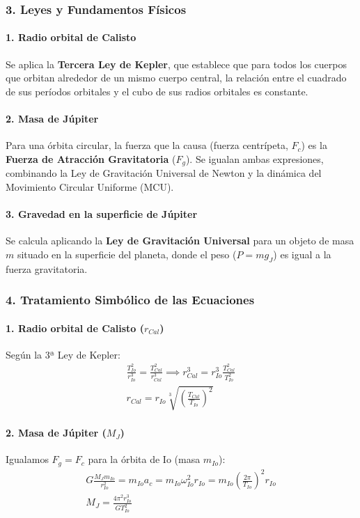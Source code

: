 \subsubsection*{3. Leyes y Fundamentos Físicos}
\paragraph*{1. Radio orbital de Calisto}
Se aplica la \textbf{Tercera Ley de Kepler}, que establece que para todos los cuerpos que orbitan alrededor de un mismo cuerpo central, la relación entre el cuadrado de sus períodos orbitales y el cubo de sus radios orbitales es constante.

\paragraph*{2. Masa de Júpiter}
Para una órbita circular, la fuerza que la causa (fuerza centrípeta, $F_c$) es la \textbf{Fuerza de Atracción Gravitatoria} ($F_g$). Se igualan ambas expresiones, combinando la Ley de Gravitación Universal de Newton y la dinámica del Movimiento Circular Uniforme (MCU).

\paragraph*{3. Gravedad en la superficie de Júpiter}
Se calcula aplicando la \textbf{Ley de Gravitación Universal} para un objeto de masa $m$ situado en la superficie del planeta, donde el peso ($P=mg_J$) es igual a la fuerza gravitatoria.

\subsubsection*{4. Tratamiento Simbólico de las Ecuaciones}
\paragraph*{1. Radio orbital de Calisto ($r_{Cal}$)}
Según la 3ª Ley de Kepler:
\begin{gather}
    \frac{T_{Io}^2}{r_{Io}^3} = \frac{T_{Cal}^2}{r_{Cal}^3} \implies r_{Cal}^3 = r_{Io}^3 \frac{T_{Cal}^2}{T_{Io}^2} \nonumber \\[8pt]
    r_{Cal} = r_{Io} \sqrt[3]{\left(\frac{T_{Cal}}{T_{Io}}\right)^2}
\end{gather}
\paragraph*{2. Masa de Júpiter ($M_J$)}
Igualamos $F_g = F_c$ para la órbita de Io (masa $m_{Io}$):
\begin{gather}
    G \frac{M_J m_{Io}}{r_{Io}^2} = m_{Io} a_c = m_{Io} \omega_{Io}^2 r_{Io} = m_{Io} \left(\frac{2\pi}{T_{Io}}\right)^2 r_{Io} \nonumber \\[8pt]
    M_J = \frac{4\pi^2 r_{Io}^3}{G T_{Io}^2}
\end{gather}
